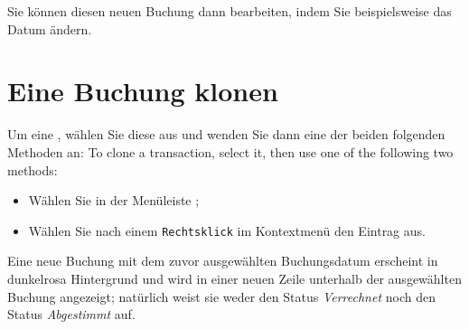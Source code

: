 Sie können diesen neuen Buchung dann bearbeiten, indem Sie beispielsweise das Datum ändern.


\section{Eine Buchung klonen\label{transactions-duplicate}}

Um eine , wählen Sie diese aus und wenden Sie dann eine der beiden folgenden Methoden an:
To clone a transaction, select it, then use one of the following two methods:
\begin{itemize}
	\item Wählen Sie in der Menüleiste ;
	\item Wählen Sie nach einem \texttt{Rechtsklick} im Kontextmenü den Eintrag  aus.
\end{itemize}

Eine neue Buchung mit dem zuvor ausgewählten Buchungsdatum erscheint in {\setlength{\fboxsep}{2pt}\colorbox[RGB]{245,155,155}{dunkelrosa Hintergrund}} und wird in einer neuen Zeile unterhalb der ausgewählten Buchung angezeigt; natürlich weist sie weder den Status \emph{Verrechnet} noch den Status \emph{Abgestimmt} auf.

